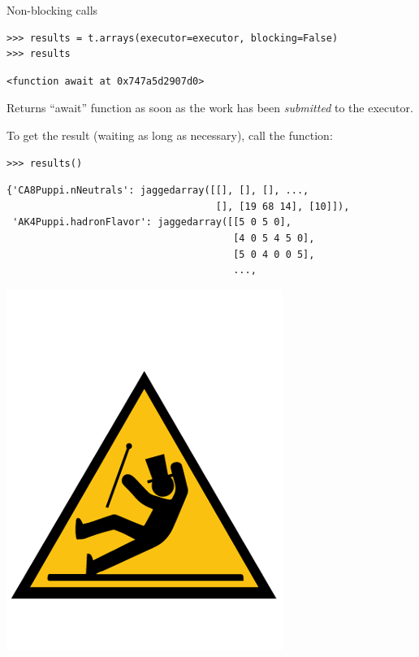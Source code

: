 \documentclass[aspectratio=169]{beamer}
\begin{document}
\begin{frame}[fragile]{Non-blocking calls}
\vspace{0.5 cm}
\small
\begin{verbatim}
>>> results = t.arrays(executor=executor, blocking=False)
>>> results
\end{verbatim}
\begin{verbatim}
<function await at 0x747a5d2907d0>
\end{verbatim}

\vspace{0.25 cm}
Returns ``await'' function as soon as the work has been {\it submitted} to the executor.

\vspace{0.25 cm}
To get the result (waiting as long as necessary), call the function:
\begin{verbatim}
>>> results()
\end{verbatim}
\begin{verbatim}
{'CA8Puppi.nNeutrals': jaggedarray([[], [], [], ...,
                                    [], [19 68 14], [10]]),
 'AK4Puppi.hadronFlavor': jaggedarray([[5 0 5 0],
                                       [4 0 5 4 5 0],
                                       [5 0 4 0 0 5],
                                       ...,
\end{verbatim}

\vspace{-2 cm}
\hfill \includegraphics[width=1.5 cm]{caution.png}\hspace{-0.9 cm}
\vspace{2 cm}
\end{frame}
\end{document}
